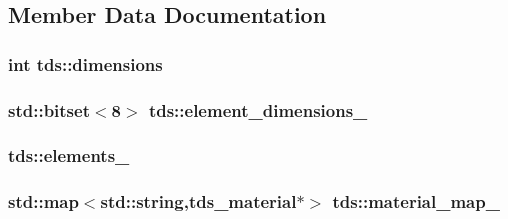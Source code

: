 \subsection{Member Data Documentation}
\subsubsection[{\texorpdfstring{dimensions}{dimensions}}]{\setlength{\rightskip}{0pt plus 5cm}int tds\+::dimensions\hspace{0.3cm}{\ttfamily [protected]}}\hypertarget{classtds_ac48ac015df4afa958eac52682954802c}{}\label{classtds_ac48ac015df4afa958eac52682954802c}
\subsubsection[{\texorpdfstring{element\+\_\+dimensions\+\_\+}{element_dimensions_}}]{\setlength{\rightskip}{0pt plus 5cm}std\+::bitset$<$8$>$ tds\+::element\+\_\+dimensions\+\_\+\hspace{0.3cm}{\ttfamily [protected]}}\hypertarget{classtds_ae110d4c4170a9197aaac3de482dfd3df}{}\label{classtds_ae110d4c4170a9197aaac3de482dfd3df}
\subsubsection[{\texorpdfstring{elements\+\_\+}{elements_}}]{ tds\+::elements\+\_\+\hspace{0.3cm}{\ttfamily [protected]}}\hypertarget{classtds_ae68472e797b37e20ac491ac8e6b5b911}{}\label{classtds_ae68472e797b37e20ac491ac8e6b5b911}
\subsubsection[{\texorpdfstring{material\+\_\+map\+\_\+}{material_map_}}]{\setlength{\rightskip}{0pt plus 5cm}std\+::map$<$std\+::string,{\bf tds\+\_\+material}$\ast$$>$ tds\+::material\+\_\+map\+\_\+\hspace{0.3cm}{\ttfamily [protected]}}\hypertarget{classtds_a84e25b033be5370a9ebf8446af204189}{}\label{classtds_a84e25b033be5370a9ebf8446af204189}
